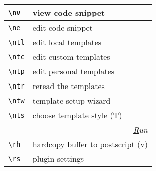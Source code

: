 \documentclass[oneside,10pt,landscape,DIV16]{scrartcl}
\begin{document}
\begin{multicols}{3}
\begin{center}
\begin{tabular}[]{|p{11mm}|p{58mm}|}
\hline \verb'\nv'  & view code snippet         \\
\hline \verb'\ne'  & edit code snippet         \\
%
\hline \verb'\ntl' & edit local templates      \\
\hline \verb'\ntc' & edit custom templates     \\
\hline \verb'\ntp' & edit personal templates   \\
\hline \verb'\ntr' & reread the templates      \\
\hline \verb'\ntw' & template setup wizard     \\
\hline \verb'\nts' & choose template style     \hfill (T)\\
%
\hline
\hline
\multicolumn{2}{|r|}{\textsl{\underline{R}un}} \\[1.0ex]
\hline \verb'\rh'    & hardcopy buffer to postscript \hfill (v)\\
\hline \verb'\rs'    & plugin settings               \\
\hline
\end{tabular}\\
%
\end{center}%
\end{multicols}%
%
\end{document}
